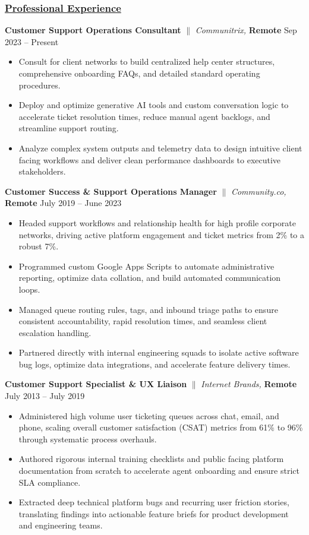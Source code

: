 \documentclass[a4paper,10pt]{article}
\begin{document}
\subsubsection{\underline{Professional Experience}}
{\textbf{Customer Support Operations Consultant} $\parallel$ \textit{Communitrix,}  \textbf{Remote} \hfill {Sep 2023 – Present}}
\begin{itemize}
      \item Consult for client networks to build centralized help center structures, comprehensive onboarding FAQs, and detailed standard operating procedures.
      \item Deploy and optimize generative AI tools and custom conversation logic to accelerate ticket resolution times, reduce manual agent backlogs, and streamline support routing.
      \item Analyze complex system outputs and telemetry data to design intuitive client facing workflows and deliver clean performance dashboards to executive stakeholders.
\end{itemize}
\vspace{1.5mm}
{\textbf{Customer Success \& Support Operations Manager} $\parallel$ \textit{Community.co,}  \textbf{Remote} \hfill {July 2019 – June 2023}}
\begin{itemize}
      \item Headed support workflows and relationship health for high profile corporate networks, driving active platform engagement and ticket metrics from 2\% to a robust 7\%.
      \item Programmed custom Google Apps Scripts to automate administrative reporting, optimize data collation, and build automated communication loops.
      \item Managed queue routing rules, tags, and inbound triage paths to ensure consistent accountability, rapid resolution times, and seamless client escalation handling.
      \item Partnered directly with internal engineering squads to isolate active software bug logs, optimize data integrations, and accelerate feature delivery times.
\end{itemize}
\vspace{1.5mm}
{\textbf{Customer Support Specialist \& UX Liaison} $\parallel$ \textit{Internet Brands,}  \textbf{Remote} \hfill {July 2013 – July 2019}}
\begin{itemize}
      \item Administered high volume user ticketing queues across chat, email, and phone, scaling overall customer satisfaction (CSAT) metrics from 61\% to 96\% through systematic process overhauls.
      \item Authored rigorous internal training checklists and public facing platform documentation from scratch to accelerate agent onboarding and ensure strict SLA compliance.
      \item Extracted deep technical platform bugs and recurring user friction stories, translating findings into actionable feature briefs for product development and engineering teams.
\end{itemize}
\end{document}
